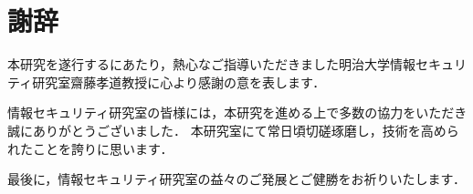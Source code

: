 \newpage
\section*{謝辞}
本研究を遂行するにあたり，熱心なご指導いただきました明治大学情報セキュリティ研究室齋藤孝道教授に心より感謝の意を表します．

情報セキュリティ研究室の皆様には，本研究を進める上で多数の協力をいただき誠にありがとうございました．
本研究室にて常日頃切磋琢磨し，技術を高められたことを誇りに思います．

最後に，情報セキュリティ研究室の益々のご発展とご健勝をお祈りいたします．
